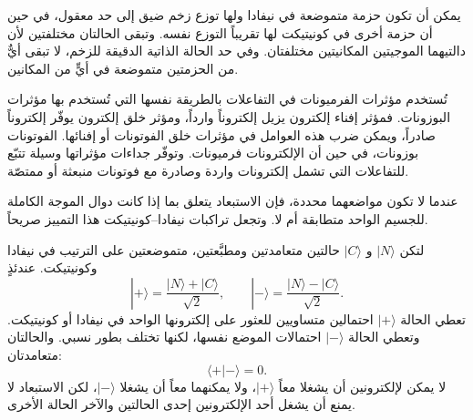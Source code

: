 يمكن أن تكون حزمة متموضعة في نيفادا ولها توزع زخم ضيق إلى حد معقول، في حين أن حزمة أخرى في كونيتيكت لها تقريباً التوزع نفسه. وتبقى الحالتان مختلفتين لأن دالتيهما الموجيتين المكانيتين مختلفتان. وفي حد الحالة الذاتية الدقيقة للزخم، لا تبقى أيٌّ من الحزمتين متموضعة في أيٍّ من المكانين.

تُستخدم مؤثرات الفرميونات في التفاعلات بالطريقة نفسها التي تُستخدم بها مؤثرات البوزونات. فمؤثر إفناء إلكترون يزيل إلكتروناً وارداً، ومؤثر خلق إلكترون يوفّر إلكتروناً صادراً، ويمكن ضرب هذه العوامل في مؤثرات خلق الفوتونات أو إفنائها. الفوتونات بوزونات، في حين أن الإلكترونات فرميونات. وتوفّر جداءات مؤثراتها وسيلة تتبّع للتفاعلات التي تشمل إلكترونات واردة وصادرة مع فوتونات منبعثة أو ممتصّة.

\begin{classroomqa}
\end{classroomqa}


عندما لا تكون مواضعهما محددة، فإن الاستبعاد يتعلق بما إذا كانت دوال الموجة الكاملة للجسيم الواحد متطابقة أم لا. وتجعل تراكبات نيفادا--كونيتيكت هذا التمييز صريحاً.

لتكن \(|N\rangle\) و \(|C\rangle\) حالتين متعامدتين ومطبَّعتين، متموضعتين على الترتيب في نيفادا وكونيتيكت. عندئذٍ
\begin{equation}
|+\rangle=\frac{|N\rangle+|C\rangle}{\sqrt2},
\qquad
|-\rangle=\frac{|N\rangle-|C\rangle}{\sqrt2}.
\end{equation}
تعطي الحالة \(|+\rangle\) احتمالين متساويين للعثور على إلكترونها الواحد في نيفادا أو كونيتيكت. وتعطي الحالة \(|-\rangle\) احتمالات الموضع نفسها، لكنها تختلف بطور نسبي. والحالتان متعامدتان:
\begin{equation}
\langle+|-\rangle=0.
\end{equation}
لا يمكن لإلكترونين أن يشغلا معاً \(|+\rangle\)، ولا يمكنهما معاً أن يشغلا \(|-\rangle\)، لكن الاستبعاد لا يمنع أن يشغل أحد الإلكترونين إحدى الحالتين والآخر الحالة الأخرى.

\begin{classroomqa}
\end{classroomqa}


